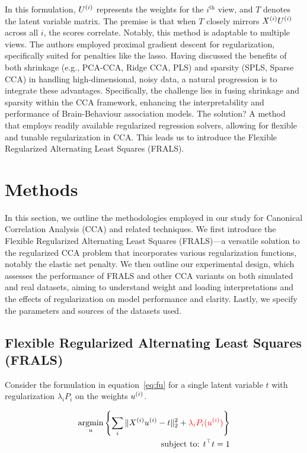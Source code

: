 In this formulation, \(U^{(i)}\) represents the weights for the $i^{\text{th}}$ view, and \(T\) denotes the latent variable matrix. The premise is that when \(T\) closely mirrors \(X^{(i)} U^{(i)}\) across all \(i\), the scores correlate.
Notably, this method is adaptable to multiple views.
The authors employed proximal gradient descent for regularization, specifically suited for penalties like the lasso.
Having discussed the benefits of both shrinkage (e.g., PCA-CCA, Ridge CCA, PLS) and sparsity (SPLS, Sparse CCA) in handling high-dimensional, noisy data, a natural progression is to integrate these advantages.
Specifically, the challenge lies in fusing shrinkage and sparsity within the CCA framework, enhancing the interpretability and performance of Brain-Behaviour association models.
The solution?
A method that employs readily available regularized regression solvers, allowing for flexible and tunable regularization in CCA.
This leads us to introduce the Flexible Regularized Alternating Least Squares (FRALS).

\section{Methods}

In this section, we outline the methodologies employed in our study for Canonical Correlation Analysis (CCA) and related techniques.
We first introduce the Flexible Regularized Alternating Least Squares (FRALS)—a versatile solution to the regularized CCA problem that incorporates various regularization functions, notably the elastic net penalty\cite{zou2005regularization}.
We then outline our experimental design, which assesses the performance of FRALS and other CCA variants on both simulated and real datasets, aiming to understand weight and loading interpretations and the effects of regularization on model performance and clarity.
Lastly, we specify the parameters and sources of the datasets used.

\subsection{Flexible Regularized Alternating Least Squares (FRALS)}\label{subsec:flexible-regularized-alternating-least
-squares-(frals)}

Consider the formulation in equation~\ref{eq:fu} for a single latent variable \(t\) with regularization $\lambda_i P_i$ on the weights \(u^{(i)}\).

\begin{align}
    \underset{u}{\mathrm{argmin}}\left\{\sum_i \|X^{(i)} u^{(i)} - t\|_2^2 + \textcolor{red}{\lambda_i P_i(u^{(i)})} \right\}\\
    \text{subject to: }t^\top t = 1\\
\end{align}

